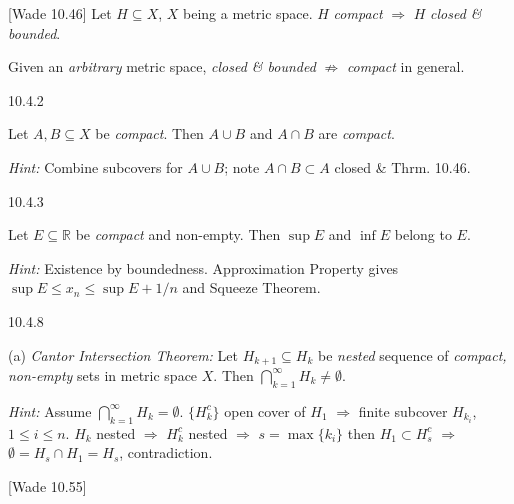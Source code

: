 \documentclass[10pt]{article} %
\newcommand{\cw}[1]{[Wade #1]}
\newcommand{\Hint}{\vspace{0.2em}\textit{Hint: }}
\renewcommand{\leq}{\leqslant}
\begin{document}
\begin{multicols}{3}
\begin{theorem}{\cw{10.46}}{}
    Let $H \subseteq X$, $X$ being a metric space. $H$ \emph{compact} $\Rightarrow$ $H$ \emph{closed \& bounded}.

\end{theorem}

\begin{remark}{10.47}{}

    Given an \emph{arbitrary} metric space, \emph{closed \& bounded} $\not\Rightarrow$ \emph{compact} in general.

\end{remark}

\begin{exercise}{10.4.2}{}

    Let $A,B \subseteq X$ be \emph{compact}. Then $A \cup B$ and $A \cap B$ are \emph{compact}.

    \Hint Combine subcovers for $A \cup B$; note $A \cap B \subset A$ closed \& Thrm. 10.46.

\end{exercise}

\begin{exercise}{10.4.3}{}

    Let $E \subseteq \mathbb{R}$ be \emph{compact} and non-empty. Then $\sup{E}$ and $\inf{E}$ belong to $E$.

    \Hint Existence by boundedness. Approximation Property gives $\sup{E} \leq x_n \leq \sup{E} + 1/n$ and Squeeze Theorem.

\end{exercise}

\begin{exercise}{10.4.8}{}

    (a) \emph{Cantor Intersection Theorem:} Let $H_{k+1} \subseteq H_k$ be \emph{nested} sequence of \emph{compact, non-empty} sets in metric space $X$. Then $\bigcap_{k=1}^{\infty} H_k \neq \emptyset$.

    \Hint Assume $\bigcap_{k=1}^{\infty} H_k = \emptyset$. $\{H_k^c\}$ open cover of $H_1$ $\Rightarrow$ finite subcover $H_{k_i}$, $1 \leq i \leq n$. $H_k$ nested $\Rightarrow$ $H_k^c$ nested $\Rightarrow$ $s = \max\{k_{i}\}$ then $H_1 \subset H_s^c$ $\Rightarrow$ $\emptyset = H_s \cap H_1 = H_s$, contradiction.

\end{exercise}

\begin{remark}{\cw{10.55}}{}


\end{remark}
\end{multicols}
\end{document}
